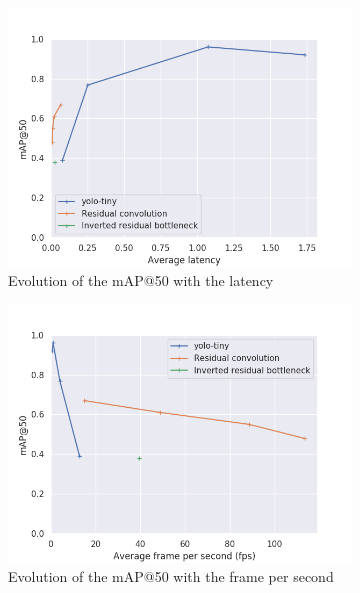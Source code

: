 \begin{figure}
  \begin{center}
    \begin{subfigure}[t]{.49\linewidth}
      \centering
      \includegraphics[width=0.99\linewidth]{figures/map_at_50_latency_models.png}
      \caption{Evolution of the mAP@50 with the latency}
    \end{subfigure}
    \begin{subfigure}[t]{.49\linewidth}
      \centering
      \includegraphics[width=0.99\linewidth]{figures/map_at_50_fps_models.png}
      \caption{Evolution of the mAP@50 with the frame per second}
    \end{subfigure}
    \begin{subfigure}[t]{.49\linewidth}

\end{subfigure}
\end{center}
\end{figure}
